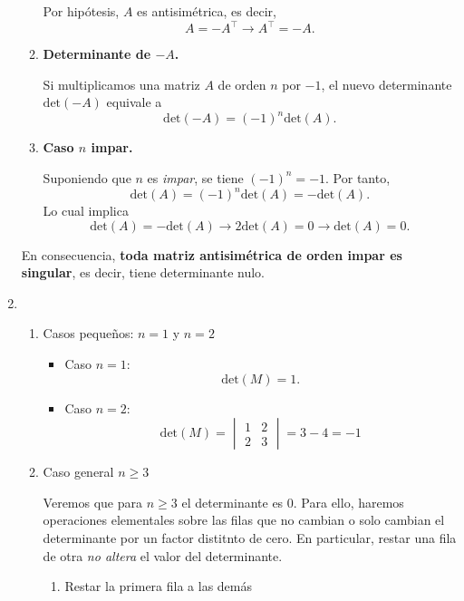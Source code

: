\begin{enumerate}[label=\color{red}\textbf{\arabic*)}]
\begin{enumerate}[label=\arabic*)]
            Por hipótesis, $A$ es antisimétrica, es decir, \[
            A=-A^\intercal\longrightarrow A^\intercal=-A.
            \] 
        \item \textbf{Determinante de $-A$.}

            Si multiplicamos una matriz $A$ de orden $n$ por $-1$, el nuevo determinante $\mathrm{det}(-A)$ equivale a \[
            \mathrm{det}(-A)=(-1)^n\mathrm{det}(A).
            \] 
        \item \textbf{Caso $n$ impar.}

            Suponiendo que $n$ es \textit{impar}, se tiene $(-1)^n=-1$. Por tanto,  \[
            \mathrm{det}(A)=(-1)^n\mathrm{det}(A)=-\mathrm{det}(A).
            \]  
            Lo cual implica \[
            \mathrm{det}(A)=-\mathrm{det}(A)\longrightarrow 2\mathrm{det}(A)=0\longrightarrow \mathrm{det}(A)=0.
            \] 
    \end{enumerate}
    En consecuencia, \textbf{toda matriz antisimétrica de orden impar es singular}, es decir, tiene determinante nulo. 
\item {}
\begin{enumerate}[label=\arabic*)]
    \item Casos pequeños: $n=1$ y  $n=2$
         \begin{itemize}[label=\textbullet]
            \item Caso $n=1$:
                \[
                \mathrm{det}(M)=1.
                \] 
            \item Caso $n=2$:  \[
            \mathrm{det}(M)=\begin{vmatrix} 
                1 & 2\\
                2 & 3
            \end{vmatrix} =3-4=-1
            \] 
        \end{itemize}
    \item Caso general $n\ge 3$

        Veremos que para $n\ge 3$ el determinante es $0$. Para ello, haremos operaciones elementales sobre las filas que no cambian o solo cambian el determinante por un factor distitnto de cero. En particular, restar una fila de otra \textit{no altera} el valor del determinante.
        \begin{enumerate}[label=\arabic*)]
            \item Restar la primera fila a las demás


\end{enumerate}
\end{enumerate}
\end{enumerate}
